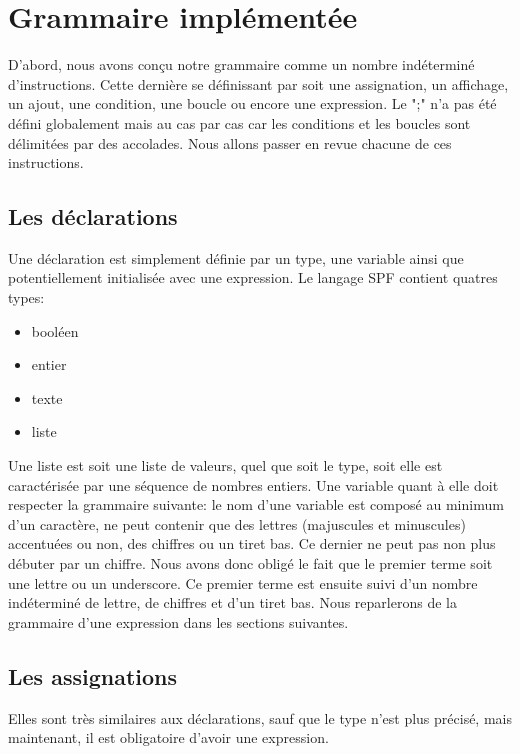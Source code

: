 \section{Grammaire implémentée}
D'abord, nous avons conçu notre grammaire
comme un nombre indéterminé d'instructions.
Cette dernière se définissant par soit une assignation, un affichage, un ajout, une condition, une boucle ou encore une expression.
Le ";" n'a pas été défini globalement mais au cas par cas car les conditions et les boucles sont délimitées par des accolades.
Nous allons passer en revue chacune de ces instructions.

\subsection{Les déclarations}
Une déclaration est simplement définie par un type, une variable ainsi que potentiellement initialisée avec une expression.
Le langage SPF contient quatres types:

\begin{itemize}
\item booléen
\item entier
\item texte
\item liste
\end{itemize}

Une liste est soit une liste de valeurs, quel que soit le type, soit elle est caractérisée par une séquence de nombres entiers.
Une variable quant à elle doit respecter la grammaire suivante:
le nom d’une variable est composé au minimum d’un caractère, ne peut contenir que des lettres (majuscules et minuscules) accentuées ou non, des chiffres ou un tiret bas.
Ce dernier ne peut pas non plus débuter par un chiffre.
Nous avons donc obligé le fait que le premier terme soit une lettre ou un underscore. Ce premier terme est ensuite suivi d'un nombre indéterminé de lettre, de chiffres et d'un tiret bas.
Nous reparlerons de la grammaire d'une expression dans les sections suivantes.

\subsection{Les assignations}
Elles sont très similaires aux déclarations, sauf que le type n'est plus précisé, mais maintenant, il est obligatoire d'avoir une expression.

